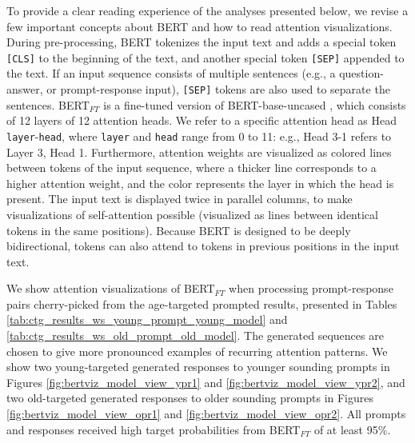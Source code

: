 To provide a clear reading experience of the analyses presented below, we revise a few important concepts about BERT and how to read attention visualizations. During pre-processing, BERT tokenizes the input text and adds a special token \texttt{[CLS]} to the beginning of the text, and another special token \texttt{[SEP]} appended to the text. If an input sequence consists of multiple sentences (e.g., a question-answer, or prompt-response input), \texttt{[SEP]} tokens are also used to separate the sentences. BERT$_{FT}$ is a fine-tuned version of BERT-base-uncased \citep{devlin-etal-2019-bert}, which consists of 12 layers of 12 attention heads. We refer to a specific attention head as Head \texttt{layer}-\texttt{head}, where \texttt{layer} and \texttt{head} range from 0 to 11: e.g., Head 3-1 refers to Layer 3, Head 1. Furthermore, attention weights are visualized as colored lines between tokens of the input sequence, where a thicker line corresponds to a higher attention weight, and the color represents the layer in which the head is present. The input text is displayed twice in parallel columns, to make visualizations of self-attention possible (visualized as lines between identical tokens in the same positions). Because BERT is designed to be deeply bidirectional, tokens can also attend to tokens in previous positions in the input text.

We show attention visualizations of BERT$_{FT}$ when processing prompt-response pairs cherry-picked from the age-targeted prompted results, presented in Tables \ref{tab:ctg_results_ws_young_prompt_young_model} and \ref{tab:ctg_results_ws_old_prompt_old_model}. The generated sequences are chosen to give more pronounced examples of recurring attention patterns. We show two young-targeted generated responses to younger sounding prompts in Figures \ref{fig:bertviz_model_view_ypr1} and \ref{fig:bertviz_model_view_ypr2}, and two old-targeted generated responses to older sounding prompts in Figures \ref{fig:bertviz_model_view_opr1} and \ref{fig:bertviz_model_view_opr2}. All prompts and responses received high target probabilities from BERT$_{FT}$ of at least 95\%.

